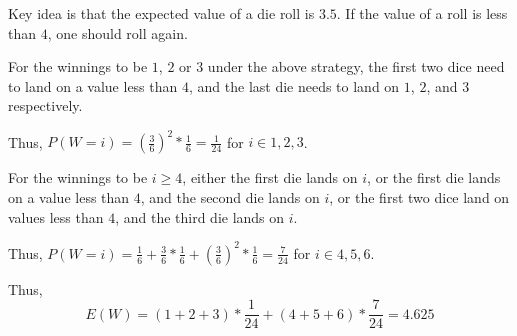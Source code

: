 Key idea is that the expected value of a die roll is $3.5$. If the value of a
roll is less than $4$, one should roll again.

For the winnings to be $1$, $2$ or $3$ under the above strategy, the first two
dice need to land on a value less than $4$, and the last die needs to land on
$1$, $2$, and $3$ respectively.

Thus, $P(W = i) = (\frac{3}{6})^2 * \frac{1}{6} = \frac{1}{24}$ for $i \in {1,
2, 3}$.

For the winnings to be $i \geq 4$, either the first die lands on $i$, or the
first die lands on a value less than $4$, and the second die lands on $i$, or the
first two dice land on values less than $4$, and the third die lands on $i$.

Thus, $P(W = i) = \frac{1}{6} + \frac{3}{6} * \frac{1}{6} + (\frac{3}{6})^{2} * 
\frac{1}{6} = \frac{7}{24}$ for $i \in {4, 5, 6}$.

Thus, $$E(W) = (1 + 2 + 3) * \frac{1}{24} + (4 + 5 + 6) * \frac{7}{24} = 4.625$$